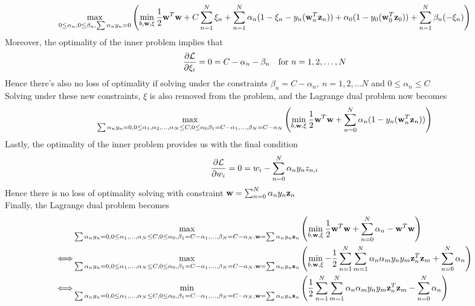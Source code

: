 \documentclass[11pt]{article}
\theoremstyle{definition}
\begin{document}
\begin{align*}
  \max_{0\leq \alpha_n, 0\leq \beta_n, \sum\alpha_ny_n = 0}\left(\min_{b, \vb{w}, \xi}\frac{1}{2}\vb{w}^T\vb{w} + C\sum^N_{n = 1}\xi_n + \sum^N_{n = 1}\alpha_n(1 - \xi_n - y_n(\vb{w}_n^T\vb{z}_n)) + \alpha_0(1 - y_0(\vb{w}_0^T\vb{z}_0)) + \sum^N_{n = 1}\beta_n(-\xi_n)\right)
\end{align*}
Moreover, the optimality of the inner problem implies that
\begin{align*}
  \pdv{\mathcal{L}}{\xi_i} = 0 = C - \alpha_n - \beta_n\quad\text{for } n = 1, 2,\dots,N
\end{align*}
Hence there's also no loss of optimality if solving under the constraints $\beta_n = C - \alpha_n,\ n = 1,2,\dots N$ and $0\leq\alpha_n\leq C$\\ 
Solving under these new constraints, $\xi$ is also removed from the problem, and the Lagrange dual problem now becomes 
\begin{align*}
  \max_{\sum\alpha_ny_n = 0, 0\leq\alpha_1, \alpha_2,\dots,\alpha_N\leq C, 0\leq\alpha_0 \beta_1 = C - \alpha_1,\dots,\beta_N = C - \alpha_N}\left(\min_{b, \vb{w}, \xi}\frac{1}{2}\vb{w}^T\vb{w} + \sum^N_{n = 0}\alpha_n(1 - y_n(\vb{w}_n^T\vb{z}_n))\right)
\end{align*}
Lastly, the optimality of the inner problem provides us with the final condition
\[
  \pdv{\mathcal{L}}{w_i} = 0 = w_i - \sum^N_{n = 0}\alpha_ny_nz_{n, i}
\]
Hence there is no loss of optimality solving with constraint $\vb{w} = \sum^N_{n = 0}\alpha_ny_n\vb{z}_n$ \\ 
Finally, the Lagrange dual problem becomes
\begin{align*}
  &\max_{\sum\alpha_ny_n = 0, 0\leq\alpha_1,\dots,\alpha_N\leq C, 0\leq\alpha_0, \beta_1 = C - \alpha_1,\dots,\beta_N = C - \alpha_N, \vb{w} = \sum\alpha_ny_n\vb{z}_n}\left(\min_{b, \vb{w}, \xi}\frac{1}{2}\vb{w}^T\vb{w} + \sum^N_{n = 0}\alpha_n - \vb{w}^T\vb{w}\right) \\
  \Longleftrightarrow &\max_{\sum\alpha_ny_n = 0, 0\leq\alpha_1,\dots,\alpha_N\leq C, 0\leq\alpha_0, \beta_1 = C - \alpha_1,\dots,\beta_N = C - \alpha_N, \vb{w} = \sum\alpha_ny_n\vb{z}_n}\left(\min_{b, \vb{w}, \xi}-\frac{1}{2}\sum^N_{n = 1}\sum^N_{m = 1}\alpha_n\alpha_my_ny_m\vb{z}_n^T\vb{z}_m+ \sum^N_{n = 0}\alpha_n\right) \\
  \Longleftrightarrow &\min_{\sum\alpha_ny_n = 0, 0\leq\alpha_1,\dots,\alpha_N\leq C, 0\leq\alpha_0, \beta_1 = C - \alpha_1,\dots,\beta_N = C - \alpha_N, \vb{w} = \sum\alpha_ny_n\vb{z}_n}\left(\frac{1}{2}\sum^N_{n = 1}\sum^N_{m = 1}\alpha_n\alpha_my_ny_m\vb{z}_n^T\vb{z}_m - \sum^N_{n = 0}\alpha_n\right) \\
\end{align*}
\end{document}
